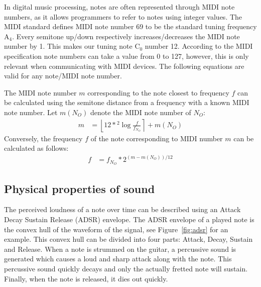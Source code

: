\documentclass[a4paper,10pt,twocolumn]{article}
\newcommand{\note}[2]{#1${}_{#2}$}
\newcommand{\round}[1]{\left \lfloor #1 \right \rceil}
\begin{document}
In digital music processing, notes are often represented through MIDI note numbers, as it allows programmers to refer to notes using integer values. The MIDI standard defines MIDI note number 69 to be the standard tuning frequency \note{A}{4}. Every semitone up/down respectively increases/decreases the MIDI note number by 1. This makes our tuning note \note{C}{0} number 12. According to the MIDI specification note numbers can take a value from 0 to 127, however, this is only relevant when communicating with MIDI devices. The following equations are valid for any note/MIDI note number.

The MIDI note number $m$ corresponding to the note closest to frequency $f$ can be calculated using the semitone distance from a frequency with a known MIDI note number. Let $m(N_O)$ denote the MIDI note number of $N_O$:
\begin{align*}
    m &= \round{12 * {}^{2}\!\log{\frac{f}{f_{N_O}}}} + m(N_O)%
\end{align*}
Conversely, the frequency $f$ of the note corresponding to MIDI number $m$ can be calculated as follows:
\begin{align*}
    f &= f_{N_O} * 2^{(m - m(N_O)) / 12}%
\end{align*}
\vfill\pagebreak


\subsection{Physical properties of sound}  \label{sec:physsound}
The perceived loudness of a note over time can be described using an Attack Decay Sustain Release (ADSR) envelope. The ADSR envelope of a played note is the convex hull of the waveform of the signal, see Figure~\ref{fig:adsr} for an example. This convex hull can be divided into four parts: Attack, Decay, Sustain and Release. When a note is strummed on the guitar, a percussive sound is generated which causes a loud and sharp attack along with the note. This percussive sound quickly decays and only the actually fretted note will sustain. Finally, when the note is released, it dies out quickly.
\end{document}
